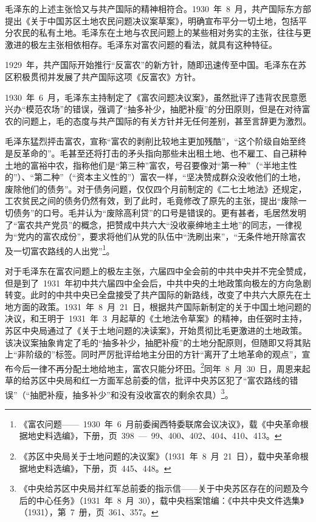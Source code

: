 毛泽东的上述主张恰又与共产国际的精神相符合。1930~年~8~月，共产国际东方部提出《关于中国苏区土地农民问题决议案草案》，明确宣布平分一切土地，包括平分农民的私有土地。毛泽东在土地与农民问题上的某些相对务实的主张，往往与更激进的极左主张相依相存。毛泽东对富农问题的看法，就具有这种特征。

1929~年，共产国际开始推行“反富农”的新方针，随即迅速传至中国。毛泽东在苏区积极贯彻并发展了共产国际这项《反富农》方针。

1930~年~6~月，毛泽东主持制定了《富农问题决议案》，虽然批评了违背农民意愿兴办“模范农场”的错误，强调了“抽多补少，抽肥补瘦”的分田原则，但是在对待富农的问题上，毛的态度与共产国际的有关方针并无任何差别，甚至言辞更为激烈。

毛泽东猛烈抨击富农，宣称“富农的剥削比较地主更加残酷”，“这个阶级自始至终是反革命的”。毛甚至还将打击的矛头指向那些未出租土地、也不雇工、自己耕种土地的富裕中农，指称他们是“第三种”富农，号召要像对“第一种”（“半地主性的”）、“第二种”（“资本主义性的”）富农一样，“坚决赞成群众没收他们的土地，废除他们的债务”。对于债务问题，仅仅四个月前制定的《二七土地法》还规定，工农贫民之间的债务仍然有效，到了此时，毛竟修改了原先的主张，提出“废除一切债务”的口号。毛并认为“废除高利贷”的口号是错误的。更有甚者，毛居然发明了“富农共产党员”的概念，把赞成中共六大“没收豪绅地主土地”的同志，一律视为“党内的富农成份”，要求将他们从党的队伍中“洗刷出来”，“无条件地开除富农及一切富农路线的人出党”\footnote{《富农问题——~1930~年~6~月前委闽西特委联席会议决议》，载《中央革命根据地史料选编》，下册，页~398~—~99、400、402、404、410、413。}。

对于毛泽东在富农问题上的极左主张，六届四中全会前的中共中央并不完全赞成，但是到了~1931~年初中共六届四中全会后，中共中央的土地政策向极左的方向急剧转变。此时的中共中央已全盘接受了共产国际的新路线，改变了中共六大原先在土地方面的政策。1931~年~8~月~21~日，根据共产国际新制定的关于中国土地问题的决议，和王明于~1931~年~3~月起草的《土地法令草案》的精神，由任弼时主持，苏区中央局通过了《关于土地问题的决读案》，开始贯彻比毛更激进的土地政策。该决议案抽象肯定了毛的“抽多补少，抽肥补瘦”的土地分配原则，但随即又将其贴上“非阶级的”标签。同时严厉批评给地主分田的方针“离开了土地革命的观点”，宣布今后一律不再分配土地给地主，富农只能分坏田。\footnote{《苏区中央局关于士地问题的决议案》（1931~年~8~月~21~日），载中央革命根据地史料选编》，下册，页~445、448。}同年~8~月~30~日，周恩来起草的给苏区中央局和红一方面军总前委的信，批评中央苏区犯了“富农路线的错误”（“抽肥补瘦，抽多补少”和没有没收富农的剩余农具）\footnote{《中央给苏区中央局并红军总前委的指示信——关于中央苏区存在的问题及今后的中心任务》（1931~年~8~月~30），载中央档案馆编：《中共中央文件选集》（1931），第~7~册，页~361、357。}。

